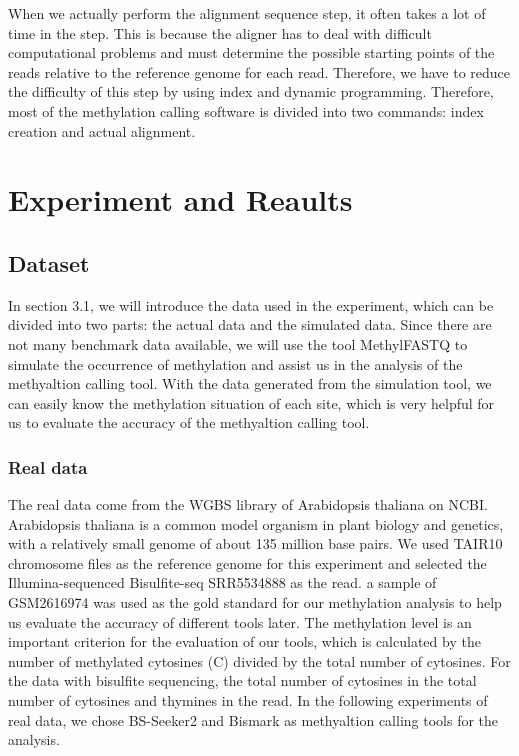 \documentclass{PHlab-thesis}
\begin{document}
\par
When we actually perform the alignment sequence step, it often takes a lot of time in the step. This is because the aligner has to deal with difficult computational problems and must determine the possible starting points of the reads relative to the reference genome for each read. Therefore, we have to reduce the difficulty of this step by using index and dynamic programming. Therefore, most of the methylation calling software is divided into two commands: index creation and actual alignment.

\chapter{Experiment and Reaults}
\section{Dataset}
In section 3.1, we will introduce the data used in the experiment, which can be divided into two parts: the actual data and the simulated data. Since there are not many benchmark data available, we will use the tool MethylFASTQ to simulate the occurrence of methylation and assist us in the analysis of the methyaltion calling tool. With the data generated from the simulation tool, we can easily know the methylation situation of each site, which is very helpful for us to evaluate the accuracy of the methyaltion calling tool.

\subsection{Real data}
The real data come from the WGBS library of Arabidopsis thaliana on NCBI. Arabidopsis thaliana is a common model organism in plant biology and genetics, with a relatively small genome of about 135 million base pairs. We used TAIR10 chromosome files as the reference genome for this experiment and selected the Illumina-sequenced Bisulfite-seq SRR5534888 as the read. a sample of GSM2616974 was used as the gold standard for our methylation analysis to help us evaluate the accuracy of different tools later. The methylation level is an important criterion for the evaluation of our tools, which is calculated by the number of methylated cytosines (C) divided by the total number of cytosines. For the data with bisulfite sequencing, the total number of cytosines in the total number of cytosines and thymines in the read. In the following experiments of real data, we chose BS-Seeker2 and Bismark as methyaltion calling tools for the analysis.
\end{document}
